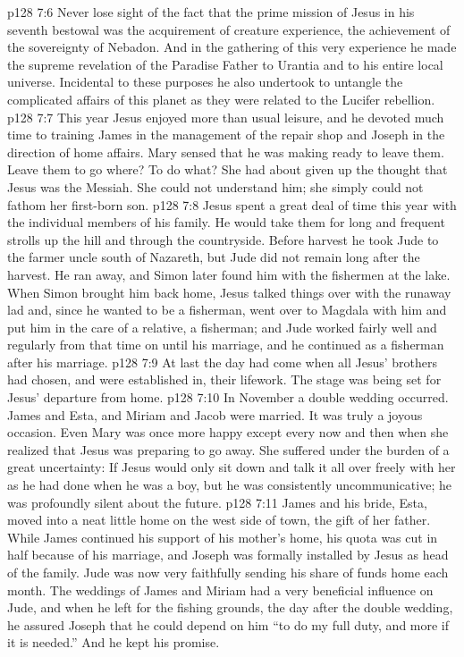 \vs p128 7:6 Never lose sight of the fact that the prime mission of Jesus in his seventh bestowal was the acquirement of creature experience, the achievement of the sovereignty of Nebadon. And in the gathering of this very experience he made the supreme revelation of the Paradise Father to Urantia and to his entire local universe. Incidental to these purposes he also undertook to untangle the complicated affairs of this planet as they were related to the Lucifer rebellion.
\vs p128 7:7 \pc This year Jesus enjoyed more than usual leisure, and he devoted much time to training James in the management of the repair shop and Joseph in the direction of home affairs. Mary sensed that he was making ready to leave them. Leave them to go where? To do what? She had about given up the thought that Jesus was the Messiah. She could not understand him; she simply could not fathom her first\hyp{}born son.
\vs p128 7:8 Jesus spent a great deal of time this year with the individual members of his family. He would take them for long and frequent strolls up the hill and through the countryside. Before harvest he took Jude to the farmer uncle south of Nazareth, but Jude did not remain long after the harvest. He ran away, and Simon later found him with the fishermen at the lake. When Simon brought him back home, Jesus talked things over with the runaway lad and, since he wanted to be a fisherman, went over to Magdala with him and put him in the care of a relative, a fisherman; and Jude worked fairly well and regularly from that time on until his marriage, and he continued as a fisherman after his marriage.
\vs p128 7:9 \pc At last the day had come when all Jesus’ brothers had chosen, and were established in, their lifework. The stage was being set for Jesus’ departure from home.
\vs p128 7:10 \pc In November a double wedding occurred. James and Esta, and Miriam and Jacob were married. It was truly a joyous occasion. Even Mary was once more happy except every now and then when she realized that Jesus was preparing to go away. She suffered under the burden of a great uncertainty: If Jesus would only sit down and talk it all over freely with her as he had done when he was a boy, but he was consistently uncommunicative; he was profoundly silent about the future.
\vs p128 7:11 James and his bride, Esta, moved into a neat little home on the west side of town, the gift of her father. While James continued his support of his mother’s home, his quota was cut in half because of his marriage, and Joseph was formally installed by Jesus as head of the family. Jude was now very faithfully sending his share of funds home each month. The weddings of James and Miriam had a very beneficial influence on Jude, and when he left for the fishing grounds, the day after the double wedding, he assured Joseph that he could depend on him “to do my full duty, and more if it is needed.” And he kept his promise.
